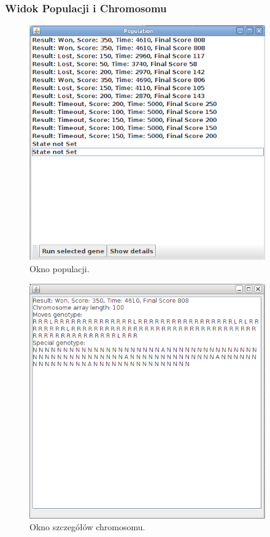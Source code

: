 \subsubsection{Widok Populacji i Chromosomu}
\begin{par}

	\begin{figure}[!h]
		\centering
		\includegraphics[width=4in]{obrazki/populacja.png}
		\caption{Okno populacji.}
		\label{fig:populacja}
	\end{figure}


	\begin{figure}[!h]
		\centering
		\includegraphics[width=4in]{obrazki/chromosom.png}
		\caption{Okno szczegółów chromosomu.}
		\label{fig:chromosom}
	\end{figure}
\end{par}

